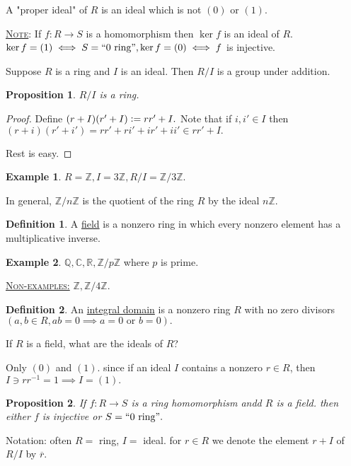 \documentclass{article}
\newcommand{\R}{\mathbb{R}}
\newcommand{\C}{\mathbb{C}}
\newcommand{\Z}{\mathbb{Z}}
\newcommand{\Q}{\mathbb{Q}}
\newcommand{\defeq}{\vcentcolon=}
\newcommand{\fancyem}[1]{\underline{\textsc{#1}}}
\newtheorem{proposition}{Proposition}[section]
\theoremstyle{definition}
\newtheorem{definition}{Definition}[section]
\newtheorem{example}{Example}[section]
\theoremstyle{remark}
\begin{document}
A "proper ideal" of $R$ is an ideal which is not $(0)$ or $(1).$

\fancyem{Note}: If $f: R \to S$ is a homomorphism then $\ker{f}$ is an ideal of $R$.
$\ker{f} = (1) \iff S = ``0 \text{ ring}", \ker{f} = (0) \iff f$ is injective.

Suppose $R$ is a ring and $I$ is an ideal. Then $R/I$ is a group under addition.
\begin{proposition}
$R/I$ is a ring.
\end{proposition}
\begin{proof}
Define $(r + I)(r' + I) \defeq rr' + I.$ Note that if $i, i' \in I$ then $(r + i)(r' + i') = rr' + ri' + ir' + ii' \in rr' + I.$

Rest is easy.
\end{proof}

\begin{example}
$R = \Z, I = 3\Z, R/I = \Z/3\Z.$

In general, $\Z/n\Z$ is the quotient of the ring $R$ by the ideal $n\Z.$
\end{example}

\begin{definition}
A \underline{field} is a nonzero ring in which every nonzero element has a multiplicative inverse.
\end{definition}

\begin{example}
$\Q, \C, \R, \Z/p\Z$ where $p$ is prime.
\end{example}
\fancyem{Non-examples:} $\Z, \Z/4\Z.$

\begin{definition}
An \underline{integral domain} is a nonzero ring $R$ with no zero divisors $(a, b \in R, ab = 0 \implies a = 0 \text{ or } b = 0).$
\end{definition}
If $R$ is a field, what are the ideals of $R$?

Only $(0)$ and $(1).$ since if an ideal $I$ contains a nonzero $r \in R$, then $I \ni rr^{-1} = 1 \implies I = (1).$

\begin{proposition}
If $f: R \to S$ is a ring homomorphism andd $R$ is a field. then either $f$ is injective or $S=``0 \text{ ring}".$
\end{proposition}

Notation: often $R = $ ring, $I = $ ideal. for $r \in R$ we denote the element $r + I$ of $R/I$ by $\overline{r}.$
\end{document}
